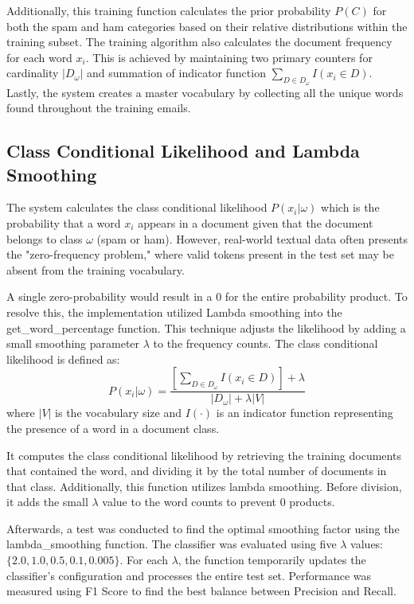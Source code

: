 \documentclass{acm_proc_article-sp}
\begin{document}
Additionally, this training function calculates the prior probability $P(C)$ for both the spam and ham categories based on their relative distributions within the training subset. The training algorithm also calculates the document frequency for each word $x_i$. This is achieved by maintaining two primary counters for cardinality $|D_{\omega}|$ and summation of indicator function $\sum_{D\in D_{\omega}}I(x_i\in D)$. Lastly, the system creates a master vocabulary by collecting all the unique words found throughout the training emails. 

\subsection{Class Conditional Likelihood and Lambda Smoothing}
The system calculates the class conditional likelihood $P(x_i|\omega)$ which is the probability that a word $x_i$ appears in a document given that the document belongs to class $\omega$ (spam or ham). However, real-world textual data often presents the "zero-frequency problem," where valid tokens present in the test set may be absent from the training vocabulary. 

A single zero-probability would result in a 0 for the entire probability product. To resolve this, the implementation utilized Lambda smoothing into the get\_word\_percentage function. This technique adjusts the likelihood by adding a small smoothing parameter $\lambda$ to the frequency counts. The class conditional likelihood is defined as:
$$P(x_{i}|\omega)=\frac{[\sum_{D\in D_{\omega}}I(x_{i}\in D)]+\lambda}{|D_{\omega}|+\lambda|V|}$$
where $|V|$ is the vocabulary size and $I(\cdot)$ is an indicator function representing the presence of a word in a document class.

It computes the class conditional likelihood by retrieving the training documents that contained the word, and dividing it by the total number of documents in that class. Additionally, this function utilizes lambda smoothing. Before division, it adds the small $\lambda$ value to the word counts to prevent 0 products.

Afterwards, a test was conducted to find the optimal smoothing factor using the lambda\_smoothing function. The classifier was evaluated using five $\lambda$ values: $\{2.0, 1.0, 0.5, 0.1, 0.005\}$. For each $\lambda$, the function temporarily updates the classifier's configuration and processes the entire test set. Performance was measured using F1 Score to find the best balance between Precision and Recall. 
\end{document}
